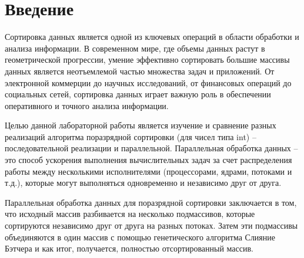 \documentclass{report}
\begin{document}
\setcounter{page}{2}

\tableofcontents
\newpage

\section*{Введение}
\par Сортировка данных является одной из ключевых операций в области обработки и анализа информации. В современном мире, где объемы данных растут в геометрической прогрессии, умение эффективно сортировать большие массивы данных является неотъемлемой частью множества задач и приложений. От электронной коммерции до научных исследований, от финансовых операций до социальных сетей, сортировка данных играет важную роль в обеспечении оперативного и точного анализа информации.

\par Целью данной лабораторной работы является изучение и сравнение разных реализаций алгоритма поразрядной сортировки (для чисел типа int) -- последовательной реализации и параллельной. Параллельная обработка данных -- это способ ускорения выполнения вычислительных задач за счет распределения работы между несколькими исполнителями (процессорами, ядрами, потоками и т.д.), которые могут выполняться одновременно и независимо друг от друга.

\par Параллельная обработка данных для поразрядной сортировки заключается в том, что исходный массив разбивается на несколько подмассивов, которые сортируются независимо друг от друга на разных потоках. Затем эти подмассивы объединяются в один массив с помощью генетического алгоритма Слияние Бэтчера и как итог, получается, полностью отсортированный массив.

\newpage

\end{document}

